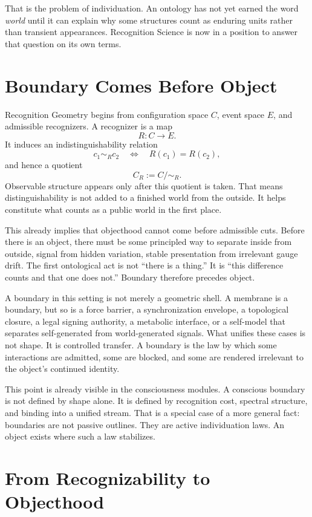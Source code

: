 \documentclass[11pt]{article}
\begin{document}
That is the problem of individuation.
An ontology has not yet earned the word \emph{world} until it can explain why some structures count as enduring units rather than transient appearances.
Recognition Science is now in a position to answer that question on its own terms.

\section{Boundary Comes Before Object}

Recognition Geometry begins from configuration space $C$, event space $E$, and admissible recognizers.
A recognizer is a map
\[
R : C \to E.
\]
It induces an indistinguishability relation
\[
c_1 \sim_R c_2 \quad \Longleftrightarrow \quad R(c_1)=R(c_2),
\]
and hence a quotient
\[
C_R := C/{\sim_R}.
\]
Observable structure appears only after this quotient is taken.
That means distinguishability is not added to a finished world from the outside.
It helps constitute what counts as a public world in the first place.

This already implies that objecthood cannot come before admissible cuts.
Before there is an object, there must be some principled way to separate inside from outside, signal from hidden variation, stable presentation from irrelevant gauge drift.
The first ontological act is not ``there is a thing.''
It is ``this difference counts and that one does not.''
Boundary therefore precedes object.

A boundary in this setting is not merely a geometric shell.
A membrane is a boundary, but so is a force barrier, a synchronization envelope, a topological closure, a legal signing authority, a metabolic interface, or a self-model that separates self-generated from world-generated signals.
What unifies these cases is not shape.
It is controlled transfer.
A boundary is the law by which some interactions are admitted, some are blocked, and some are rendered irrelevant to the object's continued identity.

This point is already visible in the consciousness modules.
A conscious boundary is not defined by shape alone.
It is defined by recognition cost, spectral structure, and binding into a unified stream.
That is a special case of a more general fact: boundaries are not passive outlines.
They are active individuation laws.
An object exists where such a law stabilizes.

\section{From Recognizability to Objecthood}
\end{document}
